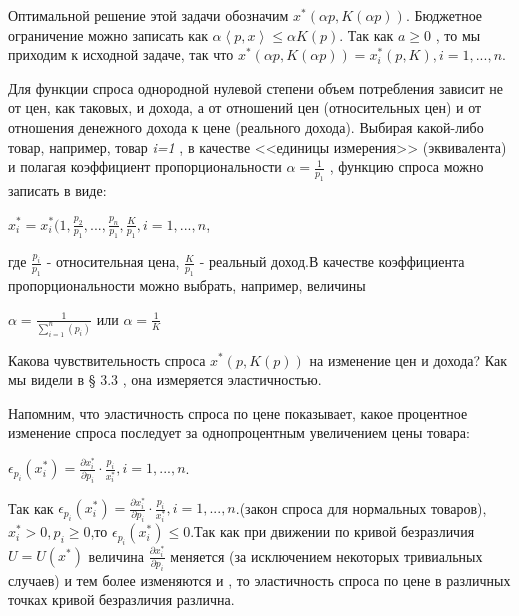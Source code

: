 \documentclass[12pt, 4paper]{book}
\begin{document}
{Оптимальной решение этой задачи обозначим  $x^{*}(\alpha p , K(\alpha p))$. Бюджетное ограничение можно записать как  $\alpha \left\langle p,x \right\rangle \leq \alpha K(p)$. Так как $a \geq 0$ , то мы приходим к исходной задаче, так что $x^{*}(\alpha p , K(\alpha p))=x_{i}^{*}(p,K),i=1,...,n$.
\par

Для функции спроса однородной нулевой степени объем потребления зависит не от цен, как таковых, и дохода, а от отношений цен (относительных цен) и от отношения денежного дохода к цене (реального дохода). Выбирая какой-либо товар, например, товар \textit{i=1} , в качестве <<единицы измерения>> (эквивалента) и полагая коэффициент пропорциональности $ \alpha = \frac{1}{p_1}$ , функцию спроса можно записать в виде: 
\begin{center}
$x_{i}^{*}=x_{i}^{*}(1,\frac{p_2}{p_1},...,\frac{p_n}{p_1},\frac{K}{p_1},i=1,...,n$,
\end{center}
\par

где $\frac{p_i}{p_1}$ - относительная цена, $\frac{K}{p_1}$ - реальный доход.В качестве коэффициента пропорциональности можно выбрать, например, величины 
\begin{center}
$\alpha = \frac{1}{\sum\limits_{i=1}^{n}(p_i)}$ или $\alpha = \frac{1}{K}$
\end{center}
\par

Какова чувствительность спроса $x^{*}(p,K(p))$ на изменение цен и дохода? Как мы видели в § 3.3 , она измеряется эластичностью.
\par

Напомним, что эластичность спроса по цене показывает, какое процентное изменение спроса последует за однопроцентным увеличением цены товара: 
\begin{center}
$\epsilon_{p_{i}}(x_{i}^{*}) = \frac{\partial x_{i}^{*}}{\partial p_i}\cdot \frac{p_i}{x_{i}^{*}},i=1,...,n$.
\end{center}
\par

Так как  $\epsilon_{p_{i}}(x_{i}^{*}) = \frac{\partial x_{i}^{*}}{\partial p_i}\cdot \frac{p_i}{x_{i}^{*}},i=1,...,n$.(закон спроса для нормальных товаров),  $x_{i}^{*} > 0,p_i \geq 0$,то $\epsilon_{p_{i}}(x_{i}^{*}) \leq 0$.Так как при движении по кривой безразличия $U=U(x^{*})$ величина $\frac{\partial x_{i}^{*}}{\partial p_i}$ меняется (за исключением некоторых тривиальных случаев) и тем более изменяются  и  , то эластичность спроса по цене в различных точках кривой безразличия различна. 
\par

}
\end{document}
